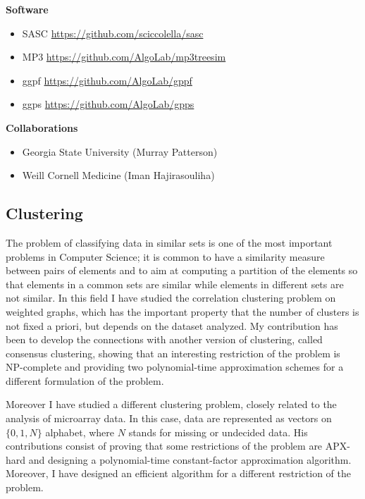 \documentclass[11pt,a4paper,roman]{moderncv}
\begin{document}
\textbf{Software}

\begin{itemize}
\item
     SASC \url{https://github.com/sciccolella/sasc}
\item
      MP3 \url{https://github.com/AlgoLab/mp3treesim}
\item
      ggpf \url{https://github.com/AlgoLab/gppf}
\item
      ggps \url{https://github.com/AlgoLab/gpps}
\end{itemize}

\textbf{Collaborations}

\begin{itemize}
\item
      Georgia State University (Murray Patterson)
\item
      Weill Cornell Medicine (Iman Hajirasouliha)
\end{itemize}

\subsection{Clustering}\label{clustering}

The problem of classifying data in similar sets is one of the most
important problems in Computer Science; it is common to have a
similarity measure between pairs of elements and to aim at computing a
partition of the elements so that elements in a common sets are similar
while elements in different sets are not similar. In this field
I have studied the correlation clustering
problem on weighted graphs, which has the important property that the number of
clusters is not fixed a priori, but depends on the dataset analyzed.
My contribution has been to develop the connections with another version of
clustering, called consensus clustering, showing that an
interesting restriction of the problem is NP-complete and providing two
polynomial-time approximation schemes for a different formulation of the
problem.

Moreover I have studied a different clustering problem, closely related
to the analysis of microarray data. In this case, data are represented
as vectors on \(\{0,1,N\}\) alphabet, where \(N\) stands for missing or
undecided data. His contributions consist of proving that some
restrictions of the problem are APX-hard and designing a polynomial-time
constant-factor approximation algorithm. Moreover, I have designed an
efficient algorithm for a different restriction of the problem.
\end{document}
